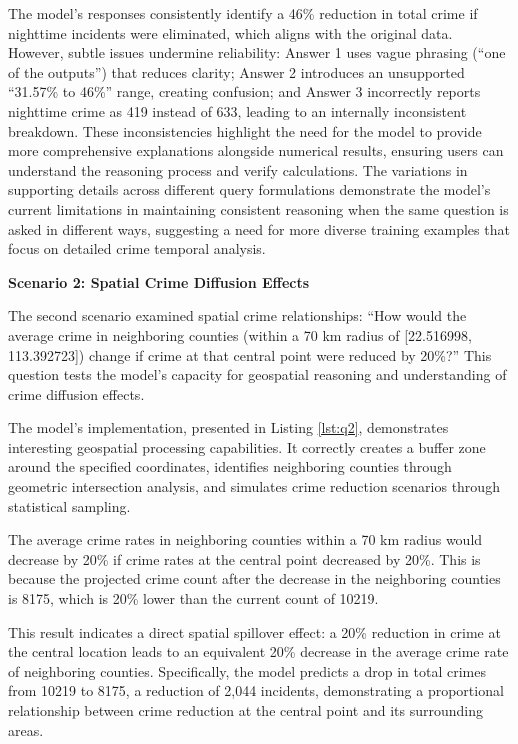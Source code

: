 The model's responses consistently identify a 46\% reduction in total crime if nighttime incidents were eliminated, which aligns with the original data. However, subtle issues undermine reliability: Answer 1 uses vague phrasing (``one of the outputs'') that reduces clarity; Answer 2 introduces an unsupported ``31.57\% to 46\%'' range, creating confusion; and Answer 3 incorrectly reports nighttime crime as 419 instead of 633, leading to an internally inconsistent breakdown. These inconsistencies highlight the need for the model to provide more comprehensive explanations alongside numerical results, ensuring users can understand the reasoning process and verify calculations. The variations in supporting details across different query formulations demonstrate the model's current limitations in maintaining consistent reasoning when the same question is asked in different ways, suggesting a need for more diverse training examples that focus on detailed crime temporal analysis.


\noindent \textbf{Scenario 2: Spatial Crime Diffusion Effects}  %

The second scenario examined spatial crime relationships: ``How would the average crime in neighboring counties (within a 70 km radius of [22.516998, 113.392723]) change if crime at that central point were reduced by 20\%?'' This question tests the model's capacity for geospatial reasoning and understanding of crime diffusion effects.

The model's implementation, presented in Listing \ref{lst:q2}, demonstrates interesting geospatial processing capabilities. It correctly creates a buffer zone around the specified coordinates, identifies neighboring counties through geometric intersection analysis, and simulates crime reduction scenarios through statistical sampling.



\begin{tcolorbox}[colback=white!95!black, colframe=black, title=Q2 Response, fontupper=\scriptsize, boxsep=2pt, left=3pt, right=3pt]
  The average crime rates in neighboring counties within a 70 km radius would decrease by 20\% if crime rates at the central point decreased by 20\%. This is because the projected crime count after the decrease in the neighboring counties is 8175, which is 20\% lower than the current count of 10219.
\end{tcolorbox}

This result indicates a direct spatial spillover effect: a 20\% reduction in crime at the central location leads to an equivalent 20\% decrease in the average crime rate of neighboring counties. Specifically, the model predicts a drop in total crimes from 10219 to 8175, a reduction of 2,044 incidents, demonstrating a proportional relationship between crime reduction at the central point and its surrounding areas.


